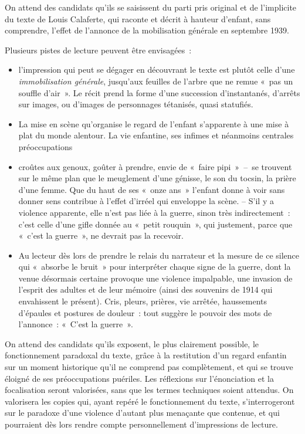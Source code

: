 {On attend des candidats qu'ils se saisissent du parti pris original et de l'implicite
du texte de Louis Calaferte, qui raconte et décrit à hauteur d'enfant, sans comprendre,
l'effet de l'annonce de la mobilisation générale en septembre 1939.

Plusieurs pistes de lecture peuvent être envisagées~:

\begin{itemize}
\item l'impression qui peut se dégager en découvrant le texte est plutôt celle d'une
\textit{immobilisation générale}, jusqu'aux feuilles de l'arbre que ne remue «~pas un souffle
d'air~». Le récit prend la forme d'une succession d'instantanés, d'arrêts sur images,
ou d'images de personnages tétanisés, quasi statufiés.
\item La mise en scène qu'organise le regard de l'enfant s'apparente à une mise à plat du
monde alentour. La vie enfantine, ses infimes et néanmoins centrales préoccupations
\item croûtes aux genoux, goûter à prendre, envie de «~faire pipi~»~--~se trouvent sur le
même plan que le meuglement d'une génisse, le son du tocsin, la prière d'une femme. Que du haut de ses «~onze ans~» l'enfant donne à voir sans donner sens
contribue à l'effet d'irréel qui enveloppe la scène.
-- S'il y a violence apparente, elle n'est pas liée à la guerre, sinon très indirectement~:
c'est celle d'une gifle donnée au «~petit rouquin~», qui justement, parce que «~c'est la
guerre~», ne devrait pas la recevoir.
\item Au lecteur dès lors de prendre le relais du narrateur et la mesure de ce silence qui
«~absorbe le bruit~» pour interpréter chaque signe de la guerre, dont la venue
désormais certaine provoque une violence impalpable, une invasion de l'esprit des
adultes et de leur mémoire (ainsi des souvenirs de 1914 qui envahissent le présent).
Cris, pleurs, prières, vie arrêtée, haussements d'épaules et postures de douleur~: tout
suggère le pouvoir des mots de l'annonce~: «~C'est la guerre~».
\end{itemize}

On attend des candidats qu'ils exposent, le plus clairement possible, le
fonctionnement paradoxal du texte, grâce à la restitution d'un regard enfantin sur un
moment historique qu'il ne comprend pas complètement, et qui se trouve éloigné de
ses préoccupations puériles. Les réflexions sur l'énonciation et la focalisation seront
valorisées, sans que les termes techniques soient attendus. On valorisera les copies
qui, ayant repéré le fonctionnement du texte, s'interrogeront sur le paradoxe d'une
violence d'autant plus menaçante que contenue, et qui pourraient dès lors rendre
compte personnellement d'impressions de lecture.\vspace*{-15pt}}%
